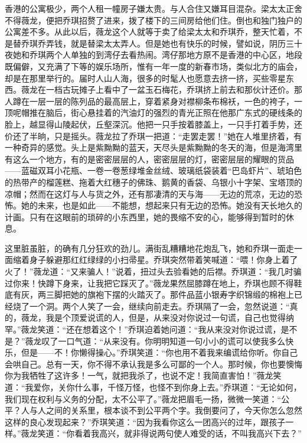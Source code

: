 \par 香港的公寓极少，两个人租一幢房子嫌太贵。与人合住又嫌耳目混杂。梁太太正舍不得薇龙，便把乔琪招赘了进来，拨了楼下的三间房给他们住。倒也和独门独户的公寓差不多。从此以后，薇龙这个人就等于卖了给梁太太和乔琪乔，整天忙着，不是替乔琪乔弄钱，就是替梁太太弄人。但是她也有快乐的时候，譬如说，阴历三十夜她和乔琪两个人单独的到湾仔去看热闹。湾仔那地方原不是香港的中心区，地段既偏僻，又充满了下等的娱乐场所，惟有一年一度的新春市场，类似北方的庙会，却是在那里举行的。届时人山人海，很多的时髦人也愿意去挤一挤，买些零星东西。薇龙在一档古玩摊子上看中了一盆玉石梅花，乔琪挤上前去和那伙计还价。那人蹲在一层一层的陈列品的最高层上，穿着紧身对襟柳条布棉袄，一色的袴子，一顶呢帽推在脑后，街心悬挂着的汽油灯的强烈的青光正照在他那广东式的硬线条的脸上，越显得山陵起伏，丘壑深沉。他把一只手按着膝盖上，一只手打着手势，还价还了半晌，只是摇头。薇龙拉了乔琪一把道：“走罢走罢！”她在人堆里挤着，有一种奇异的感觉。头上是紫黝黝的蓝天，天尽头是紫黝黝的冬天的海，但是海湾里有这么一个地方，有的是密密层层的人，密密层层的灯，密密层层的耀眼的货品——蓝磁双耳小花瓶、一卷一卷葱绿堆金丝绒、玻璃纸袋装着“巴岛虾片”、琥珀色的热带产的榴莲糕、拖着大红穗子的佛珠、鹅黄的香袋、乌银小十字架、宝塔顶的凉帽；然而在这灯与人与货之外，还有那凄清的天与海——无边的荒凉，无边的恐怖。她的未来，也是如此——不能想，想起来只有无边的恐怖。她没有天长地久的计画。只有在这眼前的琐碎的小东西里，她的畏缩不安的心，能够得到暂时的休息。
\par 这里脏虽脏，的确有几分狂欢的劲儿。满街乱糟糟地花炮乱飞，她和乔琪一面走一面缩着身子躲避那红红绿绿的小扫帚星。乔琪突然带着笑喊道：“喂！你身上着了火了！”薇龙道：“又来骗人！”说着，扭过头去验看她的后襟。乔琪道：“我几时骗过你来！快蹲下身来，让我把它踩灭了。”薇龙果然屈膝蹲在地上，乔琪也顾不得鞋底有灰，两三脚把她的旗袍下摆的火踏灭了。那件品蓝小银寿字织锦缎的棉袍上已经烧了一个洞。两个人笑了一会，继续向前走去。乔琪隔了一会，忽然说道：“真的，薇龙，我是个顶爱说谎的人，但是，从来没对你说过一句谎，自己也觉得纳罕。”薇龙笑道：“还在想着这个！”乔琪迫着她问道：“我从来没对你说过谎，是不是？”薇龙叹了一口气道：“从来没有。你明明知道一句小小的谎可以使我多么快乐，但是——不！你懒得操心。”乔琪笑道：“你也用不着我来编谎给你听。你自己会哄自己。总有一天，你不得不承认我是多么可鄙的一个人。那时候，你也要懊悔你为我牺牲了这许多！一气，就把我杀了，也说不定！我简直害怕！”薇龙笑道：“我爱你，关你什么事，千怪万怪，也怪不到你身上去。”乔琪道：“无论如何，我们现在权利与义务的分配，太不公平了。”薇龙把眉毛一扬，微微一笑道：“公平？人与人之间的关系里，根本谈不到公平两个字。我倒要问了，今天你怎么忽然这样的良心发现起来？”乔琪笑道：“因为我看你这么一团高兴的过年，跟孩子一样。”薇龙笑道：“你看着我高兴，就非得说两句使人难受的话，不叫我高兴下去？”
